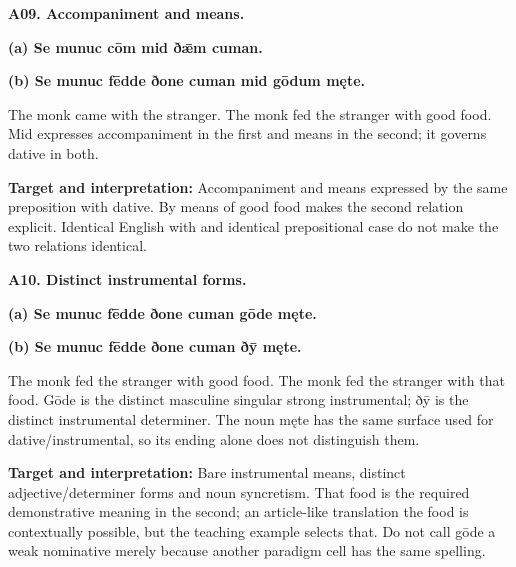 \par\begin{minipage}{\linewidth}\raggedright
\textbf{A09. Accompaniment and means.}

\textbf{(a) Se munuc cōm mid ðǣm cuman.}

\textbf{(b) Se munuc fēdde ðone cuman mid gōdum męte.}

The monk came with the stranger. The monk fed the stranger with good food. Mid expresses accompaniment in the first and means in the second; it governs dative in both.

\textbf{Target and interpretation:} Accompaniment and means expressed by the same preposition with dative. By means of good food makes the second relation explicit. Identical English with and identical prepositional case do not make the two relations identical.

\end{minipage}\par\addvspace{4pt}

\par\begin{minipage}{\linewidth}\raggedright
\textbf{A10. Distinct instrumental forms.}

\textbf{(a) Se munuc fēdde ðone cuman gōde męte.}

\textbf{(b) Se munuc fēdde ðone cuman ðȳ męte.}

The monk fed the stranger with good food. The monk fed the stranger with that food. Gōde is the distinct masculine singular strong instrumental; ðȳ is the distinct instrumental determiner. The noun męte has the same surface used for dative/\allowbreak{}instrumental, so its ending alone does not distinguish them.

\textbf{Target and interpretation:} Bare instrumental means, distinct adjective/\allowbreak{}determiner forms and noun syncretism. That food is the required demonstrative meaning in the second; an article-like translation the food is contextually possible, but the teaching example selects that. Do not call gōde a weak nominative merely because another paradigm cell has the same spelling.

\end{minipage}\par\addvspace{4pt}

